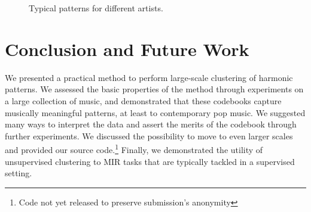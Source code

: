 \documentclass{article}
\begin{document}
\begin{figure}[t]
  \centering
  \hspace{5mm}                
  \vspace{2mm}
  \caption{\small{Typical patterns for different artists.}}
  \label{fig:typicalpat}
\end{figure}



\section{Conclusion and Future Work}
We presented a practical method to perform large-scale clustering of
harmonic patterns. We assessed the basic properties of the method through
experiments on a large collection of music, and 
demonstrated that these codebooks capture musically meaningful
patterns, at least to contemporary pop music.
%
 We suggested many ways
to interpret the data %
and assert the merits of the codebook
through further experiments.
We discussed the possibility to move to even larger scales
and provided our source code.\footnote{Code not yet released to preserve
submission's anonymity}
%
Finally, we demonstrated the utility of unsupervised clustering to MIR
tasks that are typically tackled in a supervised setting.
\end{document}
